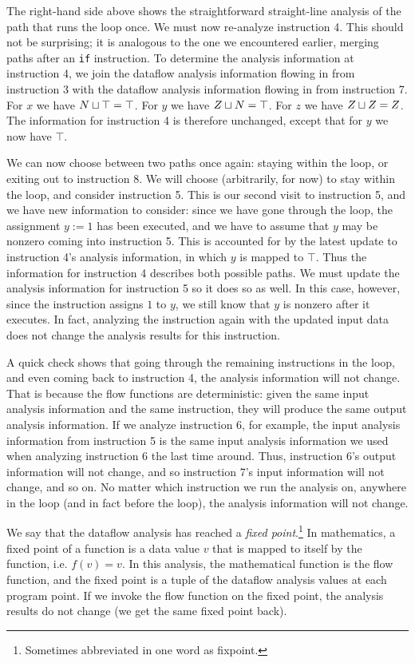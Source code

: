 \documentclass[11pt]{article}
\begin{document}
The right-hand side above shows the straightforward straight-line analysis of the path that runs
the loop once. We must now re-analyze instruction 4.  This
should not be surprising; it is analogous to the one we encountered
earlier, merging paths after an \texttt{if} instruction.  To determine the
analysis information at instruction 4, we join the dataflow analysis information
flowing in from instruction 3 with the dataflow analysis information flowing in
from instruction 7.  For $x$ we have $N \sqcup \top = \top$.  For $y$ we have $Z
\sqcup N = \top$.  For $z$ we have $Z \sqcup Z = Z$.  The information for
instruction 4 is therefore unchanged, except that for $y$ we now have $\top$.

We can now choose between two paths once again: staying within the loop, or
exiting out to instruction 8.  We will choose (arbitrarily, for now) to stay
within the loop, and consider instruction 5.  This is our second visit to
instruction 5, and we have new information to consider: since we have gone
through the loop, the assignment $y := 1$ has been executed, and we have to
assume that $y$ may be nonzero coming into instruction 5.  This is accounted for
by the latest update to instruction 4's analysis information, in which $y$ is
mapped to $\top$.  Thus the information for instruction 4 describes both
possible paths.  We must update the analysis information for instruction 5 so it
does so as well.  In this case, however, since the instruction assigns $1$ to
$y$, we still know that $y$ is nonzero after it executes.  In fact, analyzing
the instruction again with the updated input data does not change the analysis
results for this instruction.

A quick check shows that going through the remaining instructions in the loop,
and even coming back to instruction 4, the analysis information will not change.
That is because the flow functions are deterministic: given the same input
analysis information and the same instruction, they will produce the same output
analysis information.  If we analyze instruction 6, for example, the input
analysis information from instruction 5 is the same input analysis information
we used when analyzing instruction 6 the last time around.  Thus, instruction
6's output information will not change, and so instruction 7's input information
will not change, and so on.  No matter which instruction we run the analysis on,
anywhere in the loop (and in fact before the loop), the analysis information
will not change.

We say that the dataflow analysis has reached a \textit{fixed
  point}.\footnote{Sometimes abbreviated in one word as fixpoint.} In
mathematics, a fixed point of a function is a data value $v$ that is mapped to
itself by the function, i.e. $f(v) = v$.  In this analysis, the mathematical
function is the flow function, and the fixed point is a tuple of the dataflow
analysis values at each program point.  If
we invoke the flow function on the fixed point, the analysis results do not
change (we get the same fixed point back).
\end{document}
